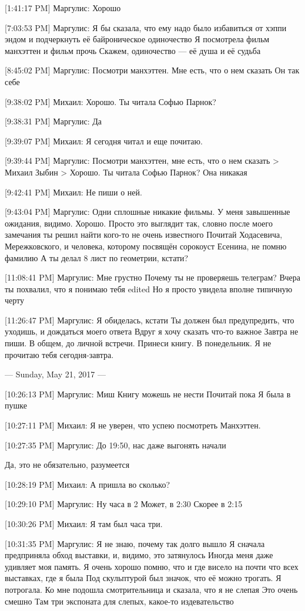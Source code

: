 \documentclass{article}
\begin{document}
{[1:41:17 PM] Маргулис:
Хорошо

[7:03:53 PM] Маргулис:
Я бы сказала, что ему надо было избавиться от хэппи эндом и подчеркнуть её байроническое одиночество
 Я посмотрела фильм манхэттен и фильм прочь
 Скажем, одиночество — её душа и её судьба

[8:45:02 PM] Маргулис:
Посмотри манхэттен. Мне есть, что о нем сказать
 Он так себе

[9:38:02 PM] Михаил:
Хорошо. Ты читала Софью Парнок?

[9:38:31 PM] Маргулис:
Да

[9:39:07 PM] Михаил:
Я сегодня читал и еще почитаю.

[9:39:44 PM] Маргулис:
Посмотри манхэттен, мне есть, что о нем сказать
> Михаил Зыбин
> Хорошо. Ты читала Софью Парнок?
Она никакая

[9:42:41 PM] Михаил:
Не пиши о ней.

[9:43:04 PM] Маргулис:
Одни сплошные никакие фильмы. У меня завышенные ожидания, видимо. Хорошо.
 Просто это выглядит так, словно после моего замечания ты решил найти кого-то не очень известного
 Почитай Ходасевича, Мережковского, и человека, которому посвящён сорокоуст Есенина, не помню фамилию
 А ты делал 8 лист по геометрии, кстати?

[11:08:41 PM] Маргулис:
Мне грустно
 Почему ты не проверяешь телеграм?
 Вчера ты похвалил, что я понимаю тебя
edited 
Но я просто увидела вполне типичную черту

[11:26:47 PM] Маргулис:
Я обиделась, кстати
 Ты должен был предупредить, что уходишь, и дождаться моего ответа
 Вдруг я хочу сказать что-то важное
 Завтра не пиши.
 В общем, до личной встречи. Принеси книгу.
 В понедельник.
 Я не прочитаю тебя сегодня-завтра.

--- Sunday, May 21, 2017 ---

[10:26:13 PM] Маргулис:
Миш
 Книгу можешь не нести
 Почитай пока
 Я была в пушке

[10:27:11 PM] Михаил:
Я не уверен, что успею посмотреть Манхэттен.

[10:27:35 PM] Маргулис:
До 19:50, нас даже выгонять начали

Да, это не обязательно, разумеется

[10:28:19 PM] Михаил:
А пришла во сколько?

[10:29:10 PM] Маргулис:
Ну часа в 2
 Может, в 2:30
 Скорее в 2:15

[10:30:26 PM] Михаил:
Я там был часа три.

[10:31:35 PM] Маргулис:
Я не знаю, почему так долго вышло
 Я сначала предприняла обход выставки, и, видимо, это затянулось
 Иногда меня даже удивляет моя память. Я очень хорошо помню, что и где висело на почти что всех выставках, где я была
 Под скульптурой был значок, что её можно трогать. Я потрогала. Ко мне подошла смотрительница и сказала, что я не слепая
 Это очень смешно
 Там три экспоната для слепых, какое-то издевательство

}
\end{document}
